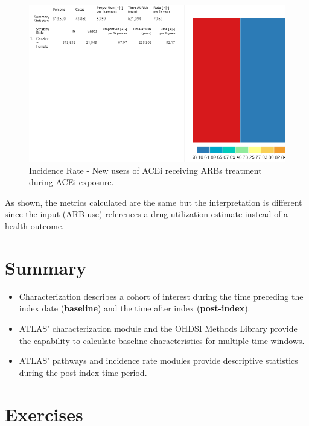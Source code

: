 \documentclass[11pt]{book}
\theoremstyle{definition}
\theoremstyle{definition}
\theoremstyle{definition}
\theoremstyle{remark}
\let\BeginKnitrBlock\begin \let\EndKnitrBlock\end
\begin{document}
\begin{figure}

{\centering \includegraphics[width=1\linewidth]{images/Characterization/atlasIncidenceResultsARB} 

}

\caption{Incidence Rate - New users of ACEi receiving ARBs treatment during ACEi exposure.}\label{fig:atlasIncidenceResultsARB}
\end{figure}

As shown, the metrics calculated are the same but the interpretation is different since the input (ARB use) references a drug utilization estimate instead of a health outcome.

\hypertarget{summary-8}{%
\section{Summary}\label{summary-8}}

\BeginKnitrBlock{rmdsummary}
\begin{itemize}
\item
  Characterization describes a cohort of interest during the time preceding the index date (\textbf{baseline}) and the time after index (\textbf{post-index}).
\item
  ATLAS' characterization module and the OHDSI Methods Library provide the capability to calculate baseline characteristics for multiple time windows.
\item
  ATLAS' pathways and incidence rate modules provide descriptive statistics during the post-index time period.
\end{itemize}
\EndKnitrBlock{rmdsummary}

\hypertarget{exercises-4}{%
\section{Exercises}\label{exercises-4}}
\end{document}
